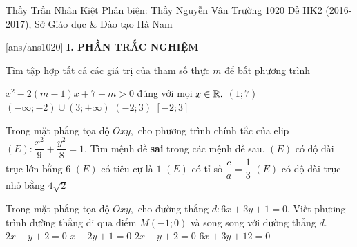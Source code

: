 	\begin{name}
{Thầy Trần Nhân Kiệt
	\newline Phản biện: Thầy Nguyễn Vân Trường}
{1020 Đề HK2 (2016-2017), Sở Giáo dục \& Đào tạo Hà Nam}
	\end{name}
	\setcounter{ex}{0}\setcounter{bt}{0}
	[ans/ans1020]
\noindent\textbf{I. PHẦN TRẮC NGHIỆM}
\begin{ex}%
	Tìm tập hợp tất cả các giá trị của tham số thực $ m $ để bất phương trình

 $ x^2-2(m-1)x+7-m>0 $ đúng với mọi $ x\in \Bbb{R}. $
	\choice
	{$ (1;7) $}
	{$ (-\infty;-2)\cup (3;+\infty) $}
	{\True $ (-2;3) $}
	{$ [-2;3] $}
\end{ex}
\begin{ex}%
	Trong mặt phẳng tọa độ $ Oxy, $ cho phương trình chính tắc của elip $ (E): \dfrac{x^2}{9}+\dfrac{y^2}{8}=1. $ Tìm mệnh đề {\bf sai} trong các mệnh đề sau.
	\choice
	{$ (E) $ có độ dài trục lớn bằng $ 6 $}
	{\True $ (E) $ có tiêu cự là $ 1 $}
	{$ (E) $ có tỉ số $ \dfrac{c}{a}=\dfrac{1}{3} $}
	{$ (E) $ có độ dài trục nhỏ bằng $ 4\sqrt{2} $}
\end{ex}
\begin{ex}%
		Trong mặt phẳng tọa độ $ Oxy, $ cho đường thẳng $ d: 6x+3y+1=0. $ Viết phương trình đường thẳng đi qua điểm $ M(-1;0) $ và song song với đường thẳng $ d. $
	\choice
	{$ 2x-y+2=0 $}
	{$ x-2y+1=0 $}
	{\True $ 2x+y+2=0 $}
	{$ 6x+3y+12=0 $}
\end{ex}
